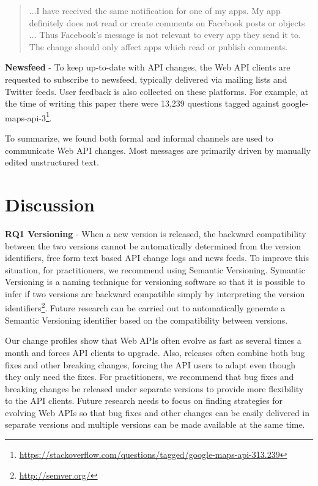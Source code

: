 \documentclass[conference]{IEEEtran}
\begin{document}
\small
\begin{quotation}
...I have received the same notification for one of my apps. My app definitely does not read or create comments on Facebook posts or objects ... Thus Facebook's message is not relevant to every app they send it to.
The change should only affect apps which read or publish comments.
\end{quotation}
\normalsize

  \textbf{Newsfeed} - To keep up-to-date with API changes, the Web API clients are requested to subscribe to newsfeed, typically delivered via mailing lists and Twitter feeds. User feedback is also collected on these platforms. For example, at the time of writing this paper there were 13,239 questions tagged against google-maps-api-3\footnote{\url{https://stackoverflow.com/questions/tagged/google-maps-api-313.239}}.


To summarize, we found both formal and informal channels are used to communicate Web API changes. Most messages are primarily driven by manually edited unstructured text.

\section{Discussion} %
\label{sec:discussion}
\textbf{RQ1 Versioning} - When a new version is released, the backward compatibility between the two versions cannot be automatically determined from the version identifiers, free form text based API change logs and news feeds. To improve this situation, for practitioners, we recommend using Semantic Versioning. Symantic Versioning is a naming technique for versioning software so that it is possible to infer if two versions are backward compatible simply by interpreting the version identifiers\footnote{\url{http://semver.org/}}. Future research can be carried out to automatically generate a Semantic Versioning identifier based on the compatibility between versions.

Our change profiles show that Web APIs often evolve as fast as several times a month and forces API clients to upgrade. Also, releases often combine both bug fixes and other breaking changes, forcing the API users to adapt even though they only need the fixes.  For practitioners, we recommend that bug fixes and breaking changes be released under separate versions to provide more flexibility to the API clients. Future research needs to focus on finding strategies for evolving Web APIs so that bug fixes and other changes can be easily delivered in separate versions and multiple versions can be made available at the same time.
\end{document}
